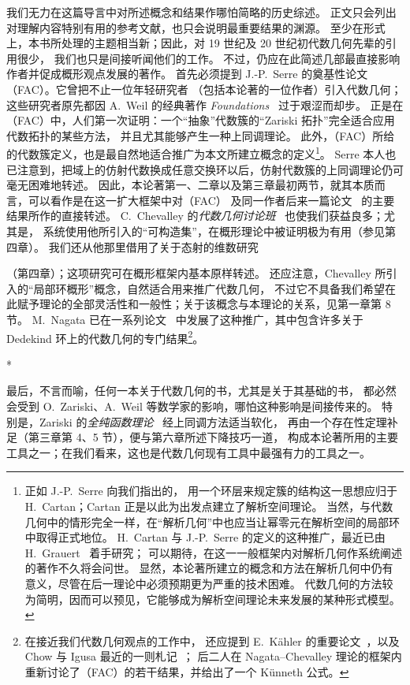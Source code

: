 \documentclass[UTF8,fontset=none,11pt,oneside,openany]{ctexbook}
\newcommand{\oldpage}[2][]{%
  \hypertarget{ega-source-page-#1-#2}{}%
  \marginnote{\scriptsize\textbf{#1}~|~#2}\ignorespaces}
\begin{document}
我们无力在这篇导言中对所述概念和结果作哪怕简略的历史综述。
正文只会列出对理解内容特别有用的参考文献，也只会说明最重要结果的渊源。
至少在形式上，本书所处理的主题相当新；因此，对 19 世纪及 20 世纪初代数几何先辈的引用很少，
我们也只是间接听闻他们的工作。
不过，仍应在此简述几部最直接影响作者并促成概形观点发展的著作。
首先必须提到 J.-P.~Serre 的奠基性论文（FAC）。它曾把不止一位年轻研究者
（包括本论著的一位作者）引入代数几何；这些研究者原先都因 A.~Weil 的经典著作
\emph{Foundations}~\cite{I-18} 过于艰涩而却步。
正是在（FAC）中，人们第一次证明：一个“抽象”代数簇的“Zariski 拓扑”完全适合应用代数拓扑的某些方法，
并且尤其能够产生一种上同调理论。
此外，（FAC）所给的代数簇定义，也是最自然地适合推广为本文所建立概念的定义\footnote{正如 J.-P.~Serre 向我们指出的，
用一个环层来规定簇的结构这一思想应归于 H.~Cartan；Cartan 正是以此为出发点建立了解析空间理论。
当然，与代数几何中的情形完全一样，在“解析几何”中也应当让幂零元在解析空间的局部环中取得正式地位。
H.~Cartan 与 J.-P.~Serre 的定义的这种推广，最近已由 H.~Grauert~\cite{I-5} 着手研究；
可以期待，在这一一般框架内对解析几何作系统阐述的著作不久将会问世。
显然，本论著所建立的概念和方法在解析几何中仍有意义，尽管在后一理论中必须预期更为严重的技术困难。
代数几何的方法较为简明，因而可以预见，它能够成为解析空间理论未来发展的某种形式模型。}。
Serre 本人也已注意到，把域上的仿射代数换成任意交换环以后，仿射代数簇的上同调理论仍可毫无困难地转述。
因此，本论著第一、二章以及第三章最初两节，就其本质而言，可以看作是在这一扩大框架中对（FAC）
及同一作者后来一篇论文~\cite{I-15} 的主要结果所作的直接转述。
C.~Chevalley 的\emph{代数几何讨论班}~\cite{I-1} 也使我们获益良多；尤其是，
系统使用他所引入的“可构造集”，在概形理论中被证明极为有用（参见第四章）。
我们还从他那里借用了关于态射的维数研究

\oldpage[I]{8}
（第四章）；这项研究可在概形框架内基本原样转述。
还应注意，Chevalley 所引入的“局部环概形”概念，自然适合用来推广代数几何，
不过它不具备我们希望在此赋予理论的全部灵活性和一般性；关于该概念与本理论的关系，见第一章第 8 节。
M.~Nagata 已在一系列论文~\cite{I-9} 中发展了这种推广，其中包含许多关于 Dedekind 环上的代数几何的专门结果\footnote{在接近我们代数几何观点的工作中，
还应提到 E.~Kähler 的重要论文~\cite{I-22}，以及 Chow 与 Igusa 最近的一则札记~\cite{I-3}；
后二人在 Nagata--Chevalley 理论的框架内重新讨论了（FAC）的若干结果，并给出了一个 Künneth 公式。}。

\bigskip
\begin{center}*\quad*\quad*\end{center}
\bigskip

最后，不言而喻，任何一本关于代数几何的书，尤其是关于其基础的书，
都必然会受到 O.~Zariski、A.~Weil 等数学家的影响，哪怕这种影响是间接传来的。
特别是，Zariski 的\emph{全纯函数理论}~\cite{I-20} 经上同调方法适当软化，
再由一个存在性定理补足（第三章第 4、5 节），便与第六章所述下降技巧一道，
构成本论著所用的主要工具之一；在我们看来，这也是代数几何现有工具中最强有力的工具之一。
\end{document}
